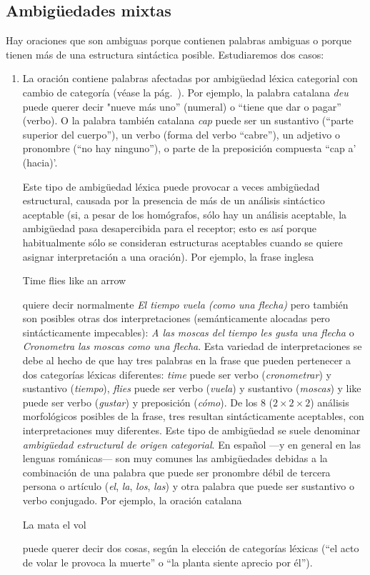 \subsection{Ambigüedades mixtas} Hay oraciones que son ambiguas porque contienen palabras ambiguas o porque tienen más de una estructura sintáctica posible. Estudiaremos dos casos: \begin{enumerate} \item La oración contiene palabras afectadas por ambigüedad léxica categorial con cambio de categoría (véase la pág.~\pageref{pg:catlex}). Por ejemplo, la palabra catalana \emph{deu} puede querer decir "nueve más uno'' (numeral) o ``tiene que dar o pagar'' (verbo). O la palabra también catalana \emph{cap} puede ser un sustantivo (``parte superior del cuerpo''), un verbo (forma del verbo ``cabre''), un adjetivo o pronombre (``no hay ninguno''), o parte de la preposición compuesta ``cap a' (hacia)'. 

Este tipo de ambigüedad léxica puede provocar a veces ambigüedad estructural, causada por la presencia de más de un análisis sintáctico aceptable (si, a pesar de los homógrafos, sólo hay un análisis aceptable, la ambigüedad pasa desapercibida para el receptor; esto es así porque habitualmente sólo se consideran estructuras aceptables cuando se quiere asignar interpretación a una oración). Por ejemplo, la frase inglesa \begin{exemple} Time flies like an arrow \end{exemple} quiere decir normalmente \emph{El tiempo vuela (como una flecha)} pero también son posibles otras dos interpretaciones (semánticamente alocadas pero sintácticamente impecables): \emph{A las moscas del tiempo les gusta una flecha} o \emph{Cronometra las moscas como una flecha}. Esta variedad de interpretaciones se debe al hecho de que hay tres palabras en la frase que pueden pertenecer a dos categorías léxicas diferentes: \emph{time} puede ser verbo (\emph{cronometrar}) y sustantivo (\emph{tiempo}), \emph{flies} puede ser verbo (\emph{vuela}) y sustantivo (\emph{moscas}) y like \emph{} puede ser verbo (\emph{gustar}) y preposición (\emph{cómo}). De los 8 ($2\times 2\times 2$) análisis morfológicos posibles de la frase, tres resultan sintácticamente aceptables, con interpretaciones muy diferentes. Este tipo de ambigüedad se suele denominar \emph{ambigüedad estructural de origen categorial}. En español ---y en general en las lenguas románicas--- son muy comunes las ambigüedades debidas a la combinación de una palabra que puede ser pronombre débil de tercera persona o artículo (\emph{el}, \emph{la}, \emph{} \emph{los}, \emph{las}) y otra palabra que puede ser sustantivo o verbo conjugado. Por ejemplo, la oración catalana \begin{exemple} La mata el vol \end{exemple} puede querer decir dos cosas, según la elección de categorías léxicas (``el acto de volar le provoca la muerte'' o ``la planta siente aprecio por él''). 


\end{enumerate}
